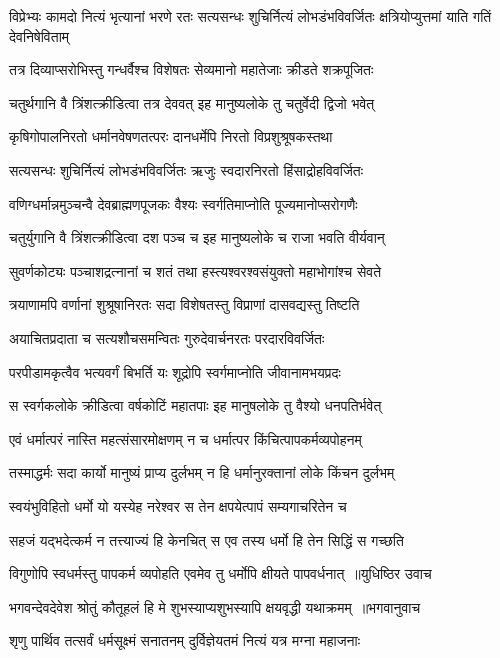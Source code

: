 \threelineshloka
{विप्रेभ्यः कामदो नित्यं भृत्यानां भरणे रतः}
{सत्यसन्धः शुचिर्नित्यं लोभडंभविवर्जितः}
{क्षत्रियोप्युत्तमां याति गतिं देवनिषेविताम्}


\twolineshloka
{तत्र दिव्याप्सरोभिस्तु गन्धर्वैश्च विशेषतः}
{सेव्यमानो महातेजाः क्रीडते शक्रपूजितः}


\twolineshloka
{चतुर्थगानि वै त्रिंशत्क्रीडित्वा तत्र देववत्}
{इह मानुष्यलोके तु चतुर्वेदी द्विजो भवेत्}


\twolineshloka
{कृषिगोपालनिरतो धर्मानवेषणतत्परः}
{दानधर्मेपि निरतो विप्रशुश्रूषकस्तथा}


\twolineshloka
{सत्यसन्धः शुचिर्नित्यं लोभडंभविवर्जितः}
{ऋजुः स्वदारनिरतो हिंसाद्रोहविवर्जितः}


\twolineshloka
{वणिग्धर्मान्नमुञ्चन्वै देवब्राह्मणपूजकः}
{वैश्यः स्वर्गतिमाप्नोति पूज्यमानोप्सरोगणैः}


\twolineshloka
{चतुर्युगानि वै त्रिंशत्क्रीडित्वा दश पञ्च च}
{इह मानुष्यलोके च राजा भवति वीर्यवान्}


\twolineshloka
{सुवर्णकोट्यः पञ्चाशद्रत्नानां च शतं तथा}
{हस्त्यश्वरश्वसंयुक्तो महाभोगांश्च सेवते}


\twolineshloka
{त्रयाणामपि वर्णानां शुश्रूषानिरतः सदा}
{विशेषतस्तु विप्राणां दासवद्यस्तु तिष्टति}


\twolineshloka
{अयाचितप्रदाता च सत्यशौचसमन्वितः}
{गुरुदेवार्चनरतः परदारविवर्जितः}


\twolineshloka
{परपीडामकृत्वैव भत्यवर्गं बिभर्ति यः}
{शूद्रोपि स्वर्गमाप्नोति जीवानामभयप्रदः}


\twolineshloka
{स स्वर्गकलोके क्रीडित्वा वर्षकोटिं महातपाः}
{इह मानुषलोके तु वैश्यो धनपतिर्भवेत्}


\twolineshloka
{एवं धर्मात्परं नास्ति महत्संसारमोक्षणम्}
{न च धर्मात्पर किंचित्पापकर्मव्यपोहनम्}


\twolineshloka
{तस्माद्धर्मः सदा कार्यो मानुष्यं प्राप्य दुर्लभम्}
{न हि धर्मानुरक्तानां लोके किंचन दुर्लभम्}


\twolineshloka
{स्वयंभुविहितो धर्मो यो यस्येह नरेश्वर}
{स तेन क्षपयेत्पापं सम्यगाचरितेन च}


\twolineshloka
{सहजं यद्भदेत्कर्म न तत्त्याज्यं हि केनचित्}
{स एव तस्य धर्मो हि तेन सिद्धिं स गच्छति}


\threelineshloka
{विगुणोपि स्वधर्मस्तु पापकर्म व्यपोहति}
{एवमेव तु धर्मोपि क्षीयते पापवर्धनात् ॥युधिष्ठिर उवाच}
{}


\threelineshloka
{भगवन्देवदेवेश श्रोतुं कौतूहलं हि मे}
{शुभस्याप्यशुभस्यापि क्षयवृद्धी यथाक्रमम् ॥भगवानुवाच}
{}


\twolineshloka
{शृणु पार्थिव तत्सर्वं धर्मसूक्ष्मं सनातनम्}
{दुर्विज्ञेयतमं नित्यं यत्र मग्ना महाजनाः}


